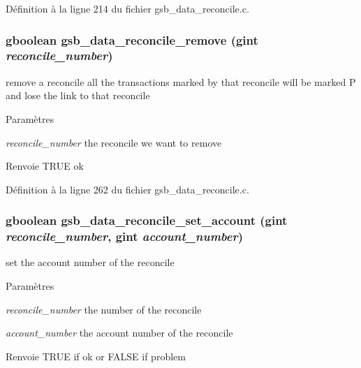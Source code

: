 Définition à la ligne 214 du fichier gsb\_\-data\_\-reconcile.c.

\subsubsection[{gsb\_\-data\_\-reconcile\_\-remove}]{\setlength{\rightskip}{0pt plus 5cm}gboolean gsb\_\-data\_\-reconcile\_\-remove (gint {\em reconcile\_\-number})}\label{gsb__data__reconcile_8c_aab7d2ded64eec85188ff49c86165b53d}
remove a reconcile all the transactions marked by that reconcile will be marked P and lose the link to that reconcile


\begin{DoxyParams}{Paramètres}
\item[{\em reconcile\_\-number}]the reconcile we want to remove\end{DoxyParams}
\begin{DoxyReturn}{Renvoie}
TRUE ok 
\end{DoxyReturn}


Définition à la ligne 262 du fichier gsb\_\-data\_\-reconcile.c.

\subsubsection[{gsb\_\-data\_\-reconcile\_\-set\_\-account}]{\setlength{\rightskip}{0pt plus 5cm}gboolean gsb\_\-data\_\-reconcile\_\-set\_\-account (gint {\em reconcile\_\-number}, \/  gint {\em account\_\-number})}\label{gsb__data__reconcile_8c_a0c9177f5d2c4a6d4746ace048acb1f81}
set the account number of the reconcile


\begin{DoxyParams}{Paramètres}
\item[{\em reconcile\_\-number}]the number of the reconcile \item[{\em account\_\-number}]the account number of the reconcile\end{DoxyParams}
\begin{DoxyReturn}{Renvoie}
TRUE if ok or FALSE if problem 
\end{DoxyReturn}


